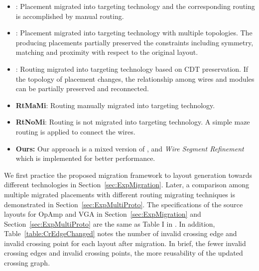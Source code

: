   \begin{itemize}
    \item {\bf \cite{msc-bhattacharya-tcad06}}: Placement migrated into targeting technology and the corresponding routing is accomplished by manual routing.
    \item {\bf \cite{ALP_YPWeng_iccad2011}}: Placement migrated into targeting technology with multiple topologies. The producing placements partially preserved the constraints including symmetry, matching and proximity with respect to the original layout.
    \item {\bf \cite{Chin_DMR_ICCAD2013}}: Routing migrated into targeting technology based on CDT preservation. If the topology of placement changes, the relationship among wires and modules can be partially preserved and reconnected.
    \item {\bf RtMaMi}: Routing manually migrated into targeting technology. 
    \item {\bf RtNoMi}: Routing is not migrated into targeting technology. A simple maze routing is applied to connect the wires. 
    \item {\bf Ours:}  Our approach is a mixed version of \cite{ALP_YPWeng_iccad2011}, \cite{Chin_DMR_ICCAD2013} and {\it Wire Segment Refinement} which is implemented for better performance.
  \end{itemize}

  We first practice the proposed migration framework to layout generation towards different technologies in Section~\ref{sec:ExpMigration}. Later, a comparison among multiple migrated placements with different routing migrating techniques is demonstrated in Section~\ref{sec:ExpMultiProto}. The specifications of the source layouts for OpAmp and VGA in Section~\ref{sec:ExpMigration} and Section~\ref{sec:ExpMultiProto} are the same as Table I in \cite{Chin_DMR_ICCAD2013}. In addition, Table~\ref{table:CrEdgeChanged} notes the number of invalid crossing edge and invalid crossing point for each layout after migration. In brief, the fewer invalid crossing edges and invalid crossing points, the more reusability of the updated crossing graph.


